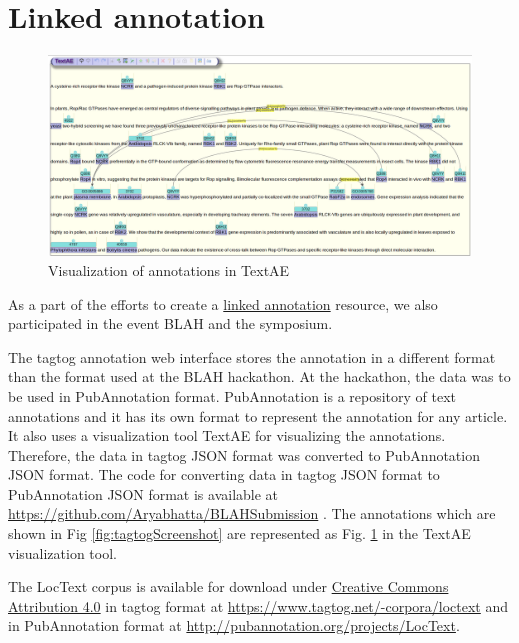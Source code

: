 \section{Linked annotation}


\begin{figure}
\centering
\includegraphics[scale=0.25]{figures/TextAE_Vis.png}
\caption{Visualization of annotations in TextAE}\label{fig:TextAEVis}
\end{figure}

As a part of the efforts to create a \hyperref[http://2015.linkedannotation.org/background]{linked annotation} resource, we also participated in the event BLAH \cite{blah} and the symposium. 

The tagtog annotation web interface stores the annotation in a different format than the format used at the BLAH hackathon. At the hackathon, the data was to be used in PubAnnotation format. PubAnnotation \cite{kim2012pubannotation} is a repository of text annotations and it has its own format to represent the annotation for any article. It also uses a visualization tool TextAE \cite{textae} for visualizing the annotations. Therefore, the data in tagtog JSON format was converted to PubAnnotation JSON format. The code for converting data in tagtog JSON format to PubAnnotation JSON format is available at \url{https://github.com/Aryabhatta/BLAHSubmission} \cite{blahsubmission}. The annotations which are shown in Fig \ref{fig:tagtogScreenshot} are represented as Fig. \ref{fig:TextAEVis} in the TextAE visualization tool. 

The LocText corpus is available for download under \hyperref[https://creativecommons.org/licenses/by/4.0/]{Creative Commons Attribution 4.0} in tagtog format at \url{https://www.tagtog.net/-corpora/loctext}  and in PubAnnotation format at \url{http://pubannotation.org/projects/LocText}.